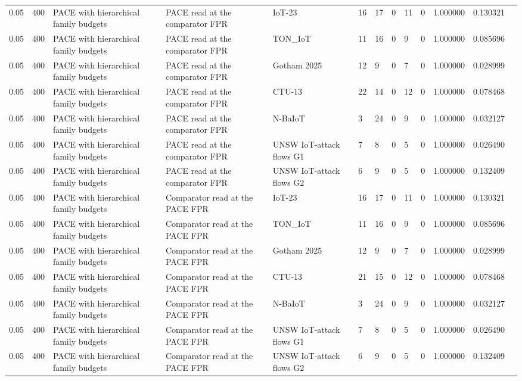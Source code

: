 \begin{tabular}{lllllllllllll}
0.05 & 400 & PACE with hierarchical family budgets & PACE read at the comparator FPR & IoT-23 & 16 & 17 & 0 & 11 & 0 & 1.000000 & 0.130321 &  \\
0.05 & 400 & PACE with hierarchical family budgets & PACE read at the comparator FPR & TON\_IoT & 11 & 16 & 0 & 9 & 0 & 1.000000 & 0.085696 &  \\
0.05 & 400 & PACE with hierarchical family budgets & PACE read at the comparator FPR & Gotham 2025 & 12 & 9 & 0 & 7 & 0 & 1.000000 & 0.028999 &  \\
0.05 & 400 & PACE with hierarchical family budgets & PACE read at the comparator FPR & CTU-13 & 22 & 14 & 0 & 12 & 0 & 1.000000 & 0.078468 &  \\
0.05 & 400 & PACE with hierarchical family budgets & PACE read at the comparator FPR & N-BaIoT & 3 & 24 & 0 & 9 & 0 & 1.000000 & 0.032127 &  \\
0.05 & 400 & PACE with hierarchical family budgets & PACE read at the comparator FPR & UNSW IoT-attack flows G1 & 7 & 8 & 0 & 5 & 0 & 1.000000 & 0.026490 &  \\
0.05 & 400 & PACE with hierarchical family budgets & PACE read at the comparator FPR & UNSW IoT-attack flows G2 & 6 & 9 & 0 & 5 & 0 & 1.000000 & 0.132409 &  \\
0.05 & 400 & PACE with hierarchical family budgets & Comparator read at the PACE FPR & IoT-23 & 16 & 17 & 0 & 11 & 0 & 1.000000 & 0.130321 &  \\
0.05 & 400 & PACE with hierarchical family budgets & Comparator read at the PACE FPR & TON\_IoT & 11 & 16 & 0 & 9 & 0 & 1.000000 & 0.085696 &  \\
0.05 & 400 & PACE with hierarchical family budgets & Comparator read at the PACE FPR & Gotham 2025 & 12 & 9 & 0 & 7 & 0 & 1.000000 & 0.028999 &  \\
0.05 & 400 & PACE with hierarchical family budgets & Comparator read at the PACE FPR & CTU-13 & 21 & 15 & 0 & 12 & 0 & 1.000000 & 0.078468 &  \\
0.05 & 400 & PACE with hierarchical family budgets & Comparator read at the PACE FPR & N-BaIoT & 3 & 24 & 0 & 9 & 0 & 1.000000 & 0.032127 &  \\
0.05 & 400 & PACE with hierarchical family budgets & Comparator read at the PACE FPR & UNSW IoT-attack flows G1 & 7 & 8 & 0 & 5 & 0 & 1.000000 & 0.026490 &  \\
0.05 & 400 & PACE with hierarchical family budgets & Comparator read at the PACE FPR & UNSW IoT-attack flows G2 & 6 & 9 & 0 & 5 & 0 & 1.000000 & 0.132409 &  \\

\end{tabular}
